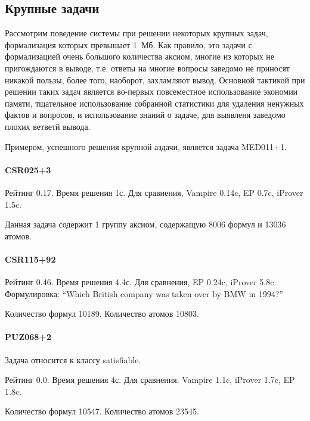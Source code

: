 \subsection{Крупные задачи}
Рассмотрим поведение системы при решении некоторых крупных задач, формализация которых превышает 1~Мб. Как правило, это задачи с формализацией очень большого количества аксиом, многие из которых не пригождаются в выводе, т.е. ответы на многие вопросы заведомо не приносят никакой пользы, более того, наоборот, захламляют вывод. Основной тактикой при решении таких задач является во-первых повсеместное использование экономии памяти, тщательное использование собранной статистики для удаления ненужных фактов и вопросов, и использование знаний о задаче, для выявленя заведомо плохих ветветй вывода.

Примером, успешного решения крупной аздачи, является задача MED011+1.

\paragraph{CSR025+3}
Рейтинг 0.17. Время решения 1с. Для сравнения, Vampire 0.14c, EP 0.7c, iProver 1.5c.

Данная задача содержит 1 группу аксиом, содержащую 8006 формул и 13036 атомов.

\paragraph{CSR115+92}
Рейтинг 0.46. Время решения 4.4с. Для сравнения, EP 0.24c, iProver 5.8c.
Формулировка: ``Which British company was taken over by BMW in 1994?''

Количество формул 10189. Количество атомов 10803.


\paragraph{PUZ068+2}
Задача относится к классу satisfiable. 

Рейтинг 0.0. Время решения 4с. Для сравнения. Vampire 1.1c, iProver 1.7c, EP 1.8c.


Количество формул 10547. Количество атомов 23545.




